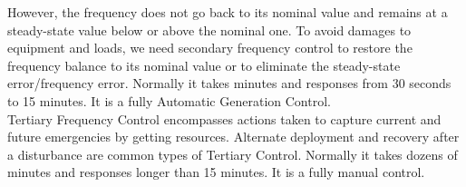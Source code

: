 However, the frequency does not go back to its nominal value and remains at a steady-state value below or above the nominal one. To avoid damages to equipment and loads, we need secondary frequency control to restore the frequency balance to its nominal value or to eliminate the steady-state error/frequency error. Normally it takes minutes and responses from 30 seconds to 15 minutes. It is a fully Automatic Generation Control.\\


Tertiary Frequency Control encompasses actions taken to capture current and future emergencies by getting resources. Alternate deployment and recovery after a disturbance are common types of Tertiary Control. Normally it takes dozens of minutes and responses longer than 15 minutes. It is a fully manual control.